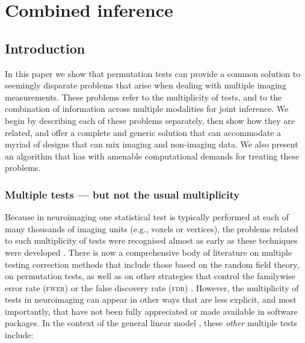 \chapter{Combined inference}
\label{sec:comb:combination}
\setstretch{\lspac}





\section{Introduction}
\label{sec:comb:intro}

In this paper we show that permutation tests can provide a common solution to seemingly disparate problems that arise when dealing with multiple imaging measurements. These problems refer to the multiplicity of tests, and to the combination of information across multiple modalities for joint inference. We begin by describing each of these problems separately, then show how they are related, and offer a complete and generic solution that can accommodate a myriad of designs that can mix imaging and non-imaging data. We also present an algorithm that has with amenable computational demands for treating these problems.

\subsection{Multiple tests --- but not the usual multiplicity}

Because in neuroimaging one statistical test is typically performed at each of many thousands of imaging units (e.g., voxels or vertices), the problems related to such multiplicity of tests were recognised almost as early as these techniques were developed \citep[for pioneering examples, see][]{Fox1988, Friston1991}. There is now a comprehensive body of literature on multiple testing correction methods that include those based on the random field theory, on permutation tests, as well as on other strategies that control the familywise error rate (\textsc{fwer}) or the false discovery rate (\textsc{fdr}) \citep[for reviews, see][]{Nichols2003, Nichols2012}. However, the multiplicity of tests in neuroimaging can appear in other ways that are less explicit, and most importantly, that have not been fully appreciated or made available in software packages. In the context of the general linear model \citep[\textsc{glm},][]{Scheffe1959}, these \emph{other} multiple tests include:

